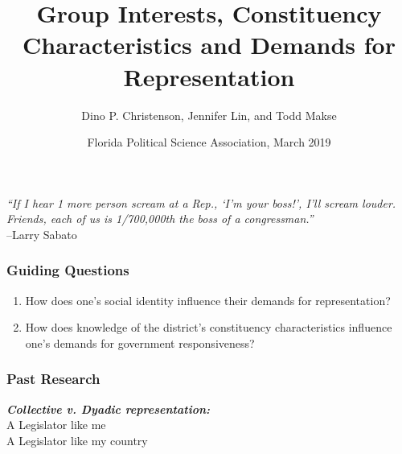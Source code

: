\documentclass[14pt]{beamer}
\newcommand\e{\emph}
\newcommand\tb{\textbf}
\begin{document}
\author[D. Christenson, J. Lin, and T. Makse] %
{Dino P. Christenson, Jennifer Lin, and Todd Makse}
\title[Demands for Representation]{Group Interests, Constituency Characteristics and Demands for Representation}
	\date[FPSA 2019]{Florida Political Science Association, March 2019}
	\begin{frame}[plain]
	\maketitle
\end{frame}

\begin{frame}
\begin{center}
	\e{“If I hear 1 more person scream at a Rep., ‘I’m your boss!’, I’ll scream louder.
	Friends, each of us is 1/700,000th the boss of a congressman.”
	} \\
		--Larry Sabato 
\end{center}
\end{frame}

\begin{frame}
\frametitle{Guiding Questions}
\begin{enumerate}
	\item How does one's social identity influence their demands for representation?
	\item How does knowledge of the district's constituency characteristics influence one's demands for government responsiveness? 
\end{enumerate}
\end{frame}

\begin{frame}
\frametitle{Past Research}
\begin{center}
	\e{\tb{Collective v. Dyadic representation:}} \\
	A Legislator like me \\
	A Legislator like my country
\end{center}
\end{frame}
\end{document}
